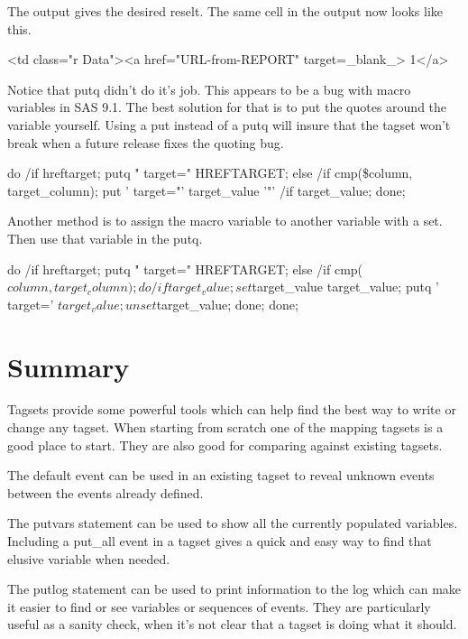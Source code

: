 The output gives the desired reselt.  The same cell in the output now looks 
like this.

\begin{sfvoutput}
<td class="r Data"><a href="URL-from-REPORT" target=_blank_>        1</a>
\end{sfvoutput}

Notice that putq didn't do it's job.  This appears to be a bug
with macro variables in SAS 9.1.  The best solution for that is to put the
quotes around the variable yourself.  Using a put instead of a
putq will insure that the tagset won't break when a future release
fixes the quoting bug.   

\begin{sfvcode}
                do /if hreftarget;
                    putq " target=" HREFTARGET;
                else /if cmp(\$column, target_column);
                    put ' target="' target_value '"' /if target_value;
                done;
\end{sfvcode}

Another method is to assign the macro variable
to another variable with a set.  Then use that variable in the putq.

\begin{sfvcode}
                do /if hreftarget;
                    putq " target=" HREFTARGET;
                else /if cmp($column, target_column);
                    do /if target_value;
                        set $target_value target_value;
                        putq ' target=' $target_value;
                        unset $target_value;
                    done;
                done;
\end{sfvcode}


\section{Summary}
Tagsets provide some powerful tools which can help find the 
best way to write or change any tagset.  When starting from
scratch one of the mapping tagsets is a good place to start.
They are also good for comparing against existing tagsets.

The default event can be used in an existing tagset to reveal
unknown events between the events already defined.

The putvars statement can be used to show all the currently populated
variables.  Including a put\_all event in a tagset gives a quick
and easy way to find that elusive variable when needed.

The putlog statement can be used to print information to the log which
can make it easier to find or see variables or sequences of events. They
are particularly useful as a sanity check, when it's not clear that a
tagset is doing what it should.



